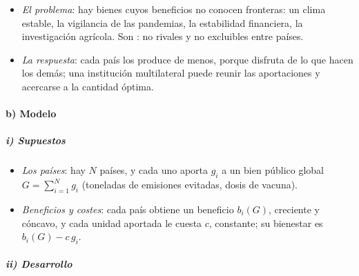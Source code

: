 \documentclass[11pt]{article}
\begin{document}
\begin{itemize}
\item \emph{El problema}: hay bienes cuyos beneficios no conocen fronteras: un clima estable, la vigilancia de las pandemias, la estabilidad financiera, la investigación agrícola. Son : no rivales y no excluibles entre países\nocite{KaulGrunbergStern1999}.
\item \emph{La respuesta}: cada país los produce de menos, porque disfruta de lo que hacen los demás; una institución multilateral puede reunir las aportaciones y acercarse a la cantidad óptima.
\end{itemize}

\paragraph{b) Modelo}

\subparagraph{i) Supuestos}

\begin{itemize}
\item \emph{Los países}: hay $N$ países, y cada uno aporta $g_i$ a un bien público global $G=\sum_{i=1}^N g_i$ (toneladas de emisiones evitadas, dosis de vacuna).
\item \emph{Beneficios y costes}: cada país obtiene un beneficio $b_i(G)$, creciente y cóncavo, y cada unidad aportada le cuesta $c$, constante; su bienestar es $b_i(G)-c\,g_i$.
\end{itemize}

\subparagraph{ii) Desarrollo}
\end{document}
